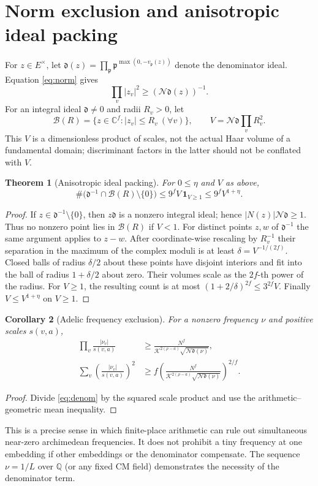 \documentclass[11pt,a4paper]{article}
\newtheorem{theorem}{Theorem}[section]\newtheorem{proposition}[theorem]{Proposition}\newtheorem{lemma}[theorem]{Lemma}\newtheorem{corollary}[theorem]{Corollary}\theoremstyle{definition}\newtheorem{definition}[theorem]{Definition}\newtheorem{remark}[theorem]{Remark}\newtheorem{obligation}[theorem]{Obligation}
\newcommand{\N}{\mathcal N}\newcommand{\OO}{\mathcal O}\newcommand{\KK}{\mathscr K}\newcommand{\Tr}{\operatorname{tr}}\newcommand{\rk}{\operatorname{rank}}\newcommand{\len}{\operatorname{length}}\newcommand{\diag}{\operatorname{diag}}\newcommand{\vol}{\operatorname{vol}}\newcommand{\Id}{\mathrm I}\newcommand{\vG}{v_{\mathrm G}}\newcommand{\supp}{\operatorname{supp}}\newcommand{\status}[1]{\par\smallskip\noindent\textit{Status.} #1\par\smallskip}
\begin{document}
\section{Norm exclusion and anisotropic ideal packing}\label{sec:packing}
For $z\in E^\times$, let $\mathfrak d(z)=\prod_{\mathfrak p}\mathfrak p^{\max(0,-v_{\mathfrak p}(z))}$ denote the denominator ideal. Equation \eqref{eq:norm} gives
\begin{equation}\label{eq:denom}
\prod_v|z_v|^2\geq(\N\mathfrak d(z))^{-1}.
\end{equation}
For an integral ideal $\mathfrak d\ne0$ and radii $R_v>0$, let
\[
\mathcal B(R)=\{z\in\mathbb C^f:|z_v|\leq R_v\ (\forall v)\},\qquad V=\N\mathfrak d\prod_v R_v^2.
\]
This $V$ is a dimensionless product of scales, not the actual Haar volume of a fundamental domain; discriminant factors in the latter should not be conflated with $V$.
\begin{theorem}[Anisotropic ideal packing]\label{thm:packing}
For $0\leq\eta$ and $V$ as above,
\begin{equation}\label{eq:pack}
\#\bigl(\mathfrak d^{-1}\cap\mathcal B(R)\setminus\{0\}\bigr)
\leq 9^f V\,\mathbf1_{V\geq1}\leq9^f V^{1+\eta}.
\end{equation}
\end{theorem}
\begin{proof}
If $z\in\mathfrak d^{-1}\setminus\{0\}$, then $z\mathfrak d$ is a nonzero integral ideal; hence $|N(z)|\N\mathfrak d\geq1$. Thus no nonzero point lies in $\mathcal B(R)$ if $V<1$. For distinct points $z,w$ of $\mathfrak d^{-1}$ the same argument applies to $z-w$. After coordinate-wise rescaling by $R_v^{-1}$ their separation in the maximum of the complex moduli is at least $\delta=V^{-1/(2f)}$. Closed balls of radius $\delta/2$ about these points have disjoint interiors and fit into the ball of radius $1+\delta/2$ about zero. Their volumes scale as the $2f$-th power of the radius. For $V\geq1$, the resulting count is at most $(1+2/\delta)^{2f}\leq 3^{2f}V$. Finally $V\leq V^{1+\eta}$ on $V\geq1$.
\end{proof}
\begin{corollary}[Adelic frequency exclusion]
For a nonzero frequency $\nu$ and positive scales $s(v,a)$,
\begin{align}
\prod_v\frac{|\nu_v|}{s(v,a)}&\geq\frac{N^f}{\KK^{2(\rho-a)}\sqrt{\N\mathfrak d(\nu)}},\\
\sum_v\left(\frac{|\nu_v|}{s(v,a)}\right)^2&\geq f\left(\frac{N^f}{\KK^{2(\rho-a)}\sqrt{\N\mathfrak d(\nu)}}\right)^{2/f}.
\end{align}
\end{corollary}
\begin{proof}Divide \eqref{eq:denom} by the squared scale product and use the arithmetic--geometric mean inequality.\end{proof}
This is a precise sense in which finite-place arithmetic can rule out simultaneous near-zero archimedean frequencies. It does not prohibit a tiny frequency at one embedding if other embeddings or the denominator compensate. The sequence $\nu=1/L$ over $\mathbb Q$ (or any fixed CM field) demonstrates the necessity of the denominator term.
\end{document}
